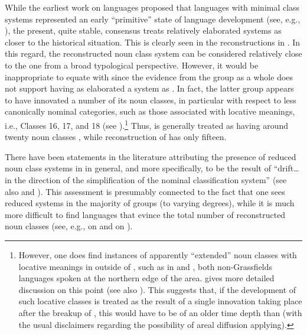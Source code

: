 \documentclass[output=paper ,collection	  ,collectionchapter ,biblatexbackend=biber   ]{langscibook}
\begin{document}
While the earliest work on  languages proposed that languages with
minimal class systems represented an early ``primitive'' state of language
development (see, e.g., ), the present, quite
stable, consensus treats relatively elaborated systems as closer to the
historical situation. This is clearly seen in the reconstructions in
. In this regard, the reconstructed  noun class
system can be considered relatively close to the  one from a
broad typological perspective. However, it would be inappropriate to equate
 with  since the evidence from the group as a whole
does not support  having as elaborated a system as
. In fact, the latter group appears to have innovated a number of its
noun classes, in particular with respect to less canonically nominal categories,
such as those associated with locative meanings, i.e., Classes 16, 17, and 18
(see ).{\footnote{However, one does find
instances of apparently ``extended'' noun classes with locative meanings in
 outside of , such as in 
\cite[265]{LovegrenMungbam} and  \cite[15--16]{Hyman1981}, both
non-Grassfields languages spoken at the northern edge of the 
area.  gives more detailed discussion on this
point (see also ). This suggests that, if the
development of such locative classes is treated as the result of a single
innovation taking place after the breakup of , this would have
to be of an older time depth than  (with the usual disclaimers
regarding the possibility of areal diffusion applying).}} Thus,  is
generally treated as having around twenty noun classes
\cite[51]{Maho1999}, while  reconstruction of
 has only fifteen.

There have been statements in the literature attributing the presence of reduced
noun class systems in  in general, and  more specifically,
to be the result of ``drift{\ldots}in the direction of the simplification of
the nominal classification system'' \cite[9]{Greenberg1966Africa} (see also
 and ). This
assessment is presumably connected to the fact that one sees reduced systems in
the majority of  groups (to varying degrees), while it is much more
difficult to find languages that evince the total number of reconstructed noun
classes (see, e.g.,  on  and
 on ).
\end{document}
